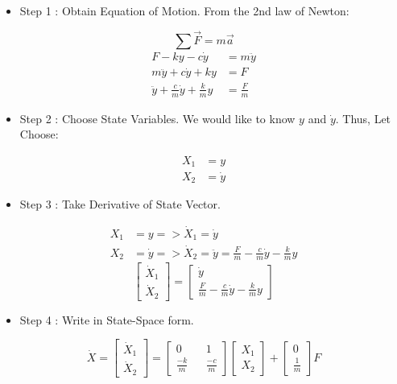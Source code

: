 \documentclass[12pt,a4paper]{article}
\begin{document}
	\begin{itemize}
		\item Step 1 : Obtain Equation of Motion. From the 2nd law of Newton:
	\end{itemize}
	\[
	\sum \vec{F} = m\vec{a}
	\]
	\[
	\begin{split}
		F - ky - c \dot{y} &= m \ddot{y} \\
		m \ddot{y} + c \dot{y} + ky &= F \\
		\ddot{y} + \frac{c}{m} \dot{y} + \frac{k}{m} y &= \frac{F}{m}
	\end{split}
	\]
	\begin{itemize}
		\item Step 2 : Choose State Variables. We would like to know \(y\) and \(\dot{y}\). Thus, Let Choose:
	\end{itemize}
	\[
	\begin{split}
		X_1 &= y \\
		X_2 &= \dot{y}
	\end{split}
	\]
	\begin{itemize}
		\item Step 3 : Take Derivative of State Vector.
	\end{itemize}
	\[
	\begin{split}
		X_1 &= y => \dot{X}_1 = \dot{y}\\
		X_2 &= \dot{y} => \dot{X}_2 = \ddot{y} = \frac{F}{m} - \frac{c}{m} \dot{y} - \frac{k}{m} y
	\end{split}
	\]
	\[
	\begin{bmatrix}
		\dot{X}_1 \\
		\dot{X}_2 
	\end{bmatrix} =
	\begin{bmatrix}
		\dot{y}                                           \\
		\frac{F}{m} - \frac{c}{m} \dot{y} - \frac{k}{m} y 
	\end{bmatrix}
	\]
	\begin{itemize}
		\item Step 4 : Write in State-Space form.
	\end{itemize}
	\[
	\dot{X} = 
	\begin{bmatrix}
		\dot{X}_1 \\
		\dot{X}_2 
	\end{bmatrix} =
	\begin{bmatrix}
		0            &   & 1            \\
		\frac{-k}{m} &   & \frac{-c}{m} 
	\end{bmatrix}
	\begin{bmatrix}
		X_1 \\
		X_2 
	\end{bmatrix} +
	\begin{bmatrix}
		0           \\
		\frac{1}{m} 
	\end{bmatrix} F
	\]
\end{document}
